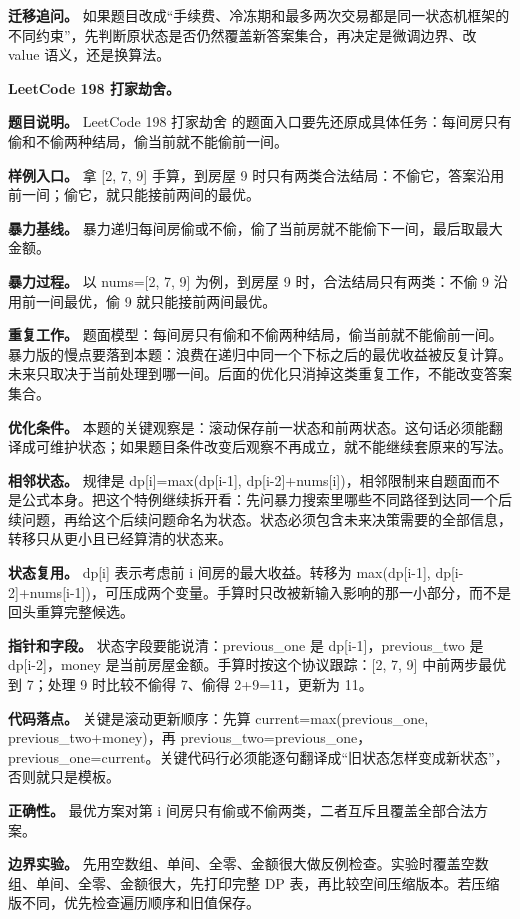 \textbf{迁移追问。} 如果题目改成“手续费、冷冻期和最多两次交易都是同一状态机框架的不同约束”，先判断原状态是否仍然覆盖新答案集合，再决定是微调边界、改 value 语义，还是换算法。

\noindent\textbf{LeetCode 198 打家劫舍。}

\textbf{题目说明。} LeetCode 198 打家劫舍 的题面入口要先还原成具体任务：每间房只有偷和不偷两种结局，偷当前就不能偷前一间。

\textbf{样例入口。} 拿 [2, 7, 9] 手算，到房屋 9 时只有两类合法结局：不偷它，答案沿用前一间；偷它，就只能接前两间的最优。

\textbf{暴力基线。} 暴力递归每间房偷或不偷，偷了当前房就不能偷下一间，最后取最大金额。

\textbf{暴力过程。} 以 nums=[2, 7, 9] 为例，到房屋 9 时，合法结局只有两类：不偷 9 沿用前一间最优，偷 9 就只能接前两间最优。

\textbf{重复工作。} 题面模型：每间房只有偷和不偷两种结局，偷当前就不能偷前一间。暴力版的慢点要落到本题：浪费在递归中同一个下标之后的最优收益被反复计算。未来只取决于当前处理到哪一间。后面的优化只消掉这类重复工作，不能改变答案集合。

\textbf{优化条件。} 本题的关键观察是：滚动保存前一状态和前两状态。这句话必须能翻译成可维护状态；如果题目条件改变后观察不再成立，就不能继续套原来的写法。

\textbf{相邻状态。} 规律是 dp[i]=max(dp[i-1], dp[i-2]+nums[i])，相邻限制来自题面而不是公式本身。把这个特例继续拆开看：先问暴力搜索里哪些不同路径到达同一个后续问题，再给这个后续问题命名为状态。状态必须包含未来决策需要的全部信息，转移只从更小且已经算清的状态来。

\textbf{状态复用。} dp[i] 表示考虑前 i 间房的最大收益。转移为 max(dp[i-1], dp[i-2]+nums[i-1])，可压成两个变量。手算时只改被新输入影响的那一小部分，而不是回头重算完整候选。

\textbf{指针和字段。} 状态字段要能说清：previous\_one 是 dp[i-1]，previous\_two 是 dp[i-2]，money 是当前房屋金额。手算时按这个协议跟踪：[2, 7, 9] 中前两步最优到 7；处理 9 时比较不偷得 7、偷得 2+9=11，更新为 11。

\textbf{代码落点。} 关键是滚动更新顺序：先算 current=max(previous\_one, previous\_two+money)，再 previous\_two=previous\_one，previous\_one=current。关键代码行必须能逐句翻译成“旧状态怎样变成新状态”，否则就只是模板。

\textbf{正确性。} 最优方案对第 i 间房只有偷或不偷两类，二者互斥且覆盖全部合法方案。

\textbf{边界实验。} 先用空数组、单间、全零、金额很大做反例检查。实验时覆盖空数组、单间、全零、金额很大，先打印完整 DP 表，再比较空间压缩版本。若压缩版不同，优先检查遍历顺序和旧值保存。

